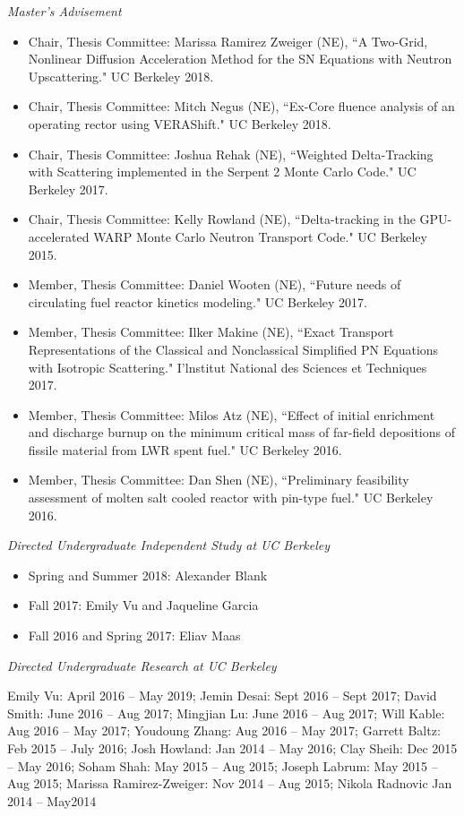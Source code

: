 \textit{Master's Advisement}
\begin{itemize}
\item Chair, Thesis Committee: Marissa Ramirez Zweiger (NE), ``A Two-Grid, Nonlinear Diffusion Acceleration Method for the SN Equations with Neutron Upscattering." UC Berkeley 2018.
%
\item Chair, Thesis Committee: Mitch Negus (NE), ``Ex-Core fluence analysis of an operating rector using VERAShift." UC Berkeley 2018.
%
\item Chair, Thesis Committee: Joshua Rehak (NE), ``Weighted Delta-Tracking with Scattering implemented in the Serpent 2 Monte Carlo Code." UC Berkeley 2017.
%
\item Chair, Thesis Committee: Kelly Rowland (NE), ``Delta-tracking in the GPU-accelerated WARP Monte Carlo Neutron Transport Code." UC Berkeley 2015.
%
\item Member, Thesis Committee: Daniel Wooten (NE), ``Future needs of circulating fuel reactor kinetics modeling." UC Berkeley 2017.
\item Member, Thesis Committee: Ilker Makine (NE), ``Exact Transport Representations of the Classical and Nonclassical Simplified PN Equations with Isotropic Scattering." I'lnstitut National des Sciences et Techniques 2017.
%
\item Member, Thesis Committee: Milos Atz (NE), ``Effect of initial enrichment and discharge burnup on the minimum critical mass of far-field depositions of fissile material from LWR spent fuel." UC Berkeley 2016.
%
\item Member, Thesis Committee: Dan Shen (NE), ``Preliminary feasibility assessment of molten salt cooled reactor with pin-type fuel." UC Berkeley 2016.
\end{itemize}

\textit{Directed Undergraduate Independent Study at UC Berkeley}
\begin{itemize}
\item Spring and Summer 2018: Alexander Blank
\item Fall 2017: Emily Vu and Jaqueline Garcia
\item Fall 2016 and Spring 2017: Eliav Maas
\end{itemize}
\textit{Directed Undergraduate Research at UC Berkeley}
\vspace*{-.6 em}
\begin{addmargin}[1em]{0 em}
Emily Vu: April 2016 -- May 2019; 
Jemin Desai: Sept 2016 -- Sept 2017; 
David Smith: June 2016 -- Aug 2017; 
Mingjian Lu: June 2016 -- Aug 2017; 
Will Kable: Aug 2016 -- May 2017; 
Youdoung Zhang: Aug 2016 -- May 2017; 
Garrett Baltz: Feb 2015 -- July 2016; 
Josh Howland: Jan 2014 -- May 2016; 
Clay Sheih: Dec 2015 -- May 2016;
Soham Shah: May 2015 -- Aug 2015; 
Joseph Labrum: May 2015 -- Aug 2015; 
Marissa Ramirez-Zweiger: Nov 2014 -- Aug 2015; 
Nikola Radnovic Jan 2014 -- May2014 

\end{addmargin}

